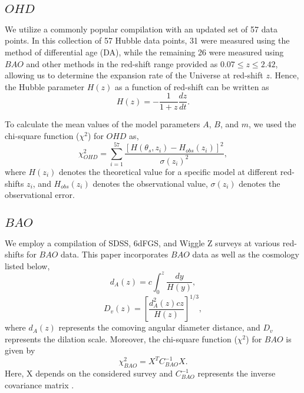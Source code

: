 \documentclass[prd,superscriptaddress,amsfonts,amssymb,amsmath,showpacs,twocolumn]{revtex4-2}
\begin{document}
\subsection{$OHD$}

We utilize a commonly popular compilation with an updated set of 57 data
points. In this collection of 57 Hubble data points, 31 were measured using
the method of differential age (DA), while the remaining 26 were measured
using $BAO$ and other methods in the red-shift range provided as $0.07\leq
z\leq2.42$, allowing us to determine the expansion rate of the Universe at
red-shift $z$. Hence, the Hubble parameter $H(z)$ as a function of red-shift
can be written as 
\begin{equation}
H(z)= -\frac{1}{1+z} \frac{dz}{dt}.
\end{equation}

To calculate the mean values of the model parameters  $A$, $B$, and $m$, we
used the chi-square function ($\chi^{2}$) for $OHD$ as, 
\begin{equation}
\chi^{2}_{OHD} = \sum_{i=1}^{57} \frac{\left[H(\theta_{s}, z_{i})-
H_{obs}(z_{i})\right]^2}{\sigma(z_{i})^2},
\end{equation}
where $H(z_{i})$ denotes the theoretical value for a specific model at
different red-shifts $z_{i}$, and $H_{obs}(z_{i})$ denotes the observational
value, $\sigma(z_{i})$ denotes the observational error.

\subsection{$BAO$}

We employ a compilation of SDSS, 6dFGS, and Wiggle Z surveys at various
red-shifts for $BAO$ data. This paper incorporates $BAO$ data as well as the
cosmology listed below, 
\begin{equation}
d_{A}(z)=c \int_{0}^{z} \frac{dy}{H(y)},
\end{equation}
\begin{equation}
D_{v}(z)=\left[ \frac{d_{A}^2 (z) c z }{H(z)} \right]^{1/3},
\end{equation}
where $d_{A}(z)$ represents the comoving angular diameter distance, and $%
D_{v}$ represents the dilation scale. Moreover, the chi-square function ($%
\chi^{2}$) for $BAO$ is given by 
\begin{equation}
\chi^{2}_{BAO} = X^{T} C_{BAO}^{-1} X.
\end{equation}
Here, X depends on the considered survey and $C_{BAO}^{-1}$ represents the
inverse covariance matrix \cite{Giostri/2012}.
\end{document}
